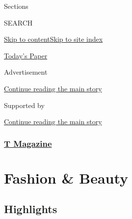 Sections

SEARCH

\protect\hyperlink{site-content}{Skip to
content}\protect\hyperlink{site-index}{Skip to site index}

\href{https://myaccount.nytimes3xbfgragh.onion/auth/login?response_type=cookie\&client_id=vi}{}

\href{https://www.nytimes3xbfgragh.onion/section/todayspaper}{Today's
Paper}

Advertisement

\protect\hyperlink{after-top}{Continue reading the main story}

Supported by

\protect\hyperlink{after-sponsor}{Continue reading the main story}

\hypertarget{t-magazine}{%
\subsubsection{\texorpdfstring{\href{/section/t-magazine}{T
Magazine}}{T Magazine}}\label{t-magazine}}

\hypertarget{fashion--beauty}{%
\section{Fashion \& Beauty}\label{fashion--beauty}}

\hypertarget{highlights}{%
\subsection{Highlights}\label{highlights}}

